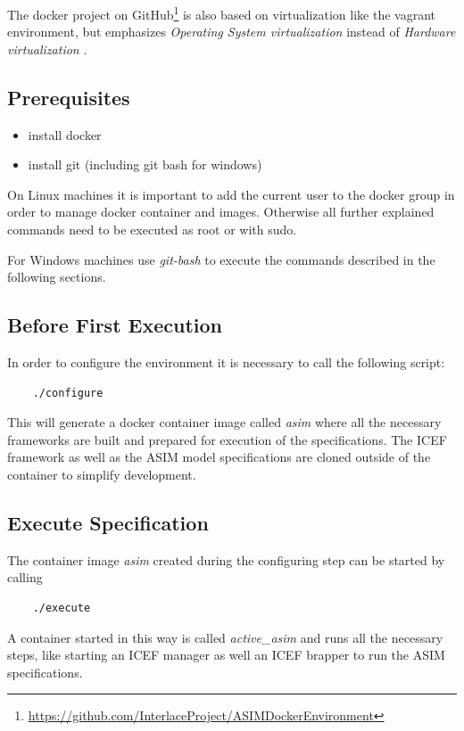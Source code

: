 The docker project on GitHub\footnote{\url{https://github.com/InterlaceProject/ASIMDockerEnvironment}} is also based on virtualization like the vagrant environment, but emphasizes \textit{Operating System virtualization} instead of \textit{Hardware virtualization} \cite{VirtualMachines2005}.

\subsection{Prerequisites}

\begin{itemize}
	\item install docker
	\item install git (including git bash for windows)
\end{itemize}
On Linux machines it is important to add the current user to the docker group in order to manage docker container and images. Otherwise all further explained commands need to be executed as root or with sudo.

For Windows machines use \textit{git-bash} to execute the commands described in the following sections.

\subsection{Before First Execution}

In order to configure the environment it is necessary to call the following script:
\begin{lstlisting}
	./configure
\end{lstlisting}
This will generate a docker container image called \textit{asim} where all the necessary frameworks are built and prepared for execution of the specifications. The ICEF framework as well as the ASIM model specifications are cloned outside of the container to simplify development.

\subsection{Execute Specification}
The container image \textit{asim} created during the configuring step can be started by calling
\begin{lstlisting}
	./execute
\end{lstlisting}
A container started in this way is called \textit{active\_asim} and runs all the necessary steps, like starting an ICEF manager as well an ICEF brapper to run the ASIM specifications.

